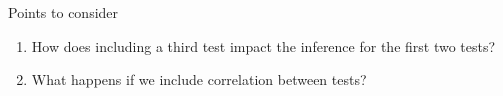 \documentclass[
  ignorenonframetext,
  aspectratio=169,
]{beamer}
\begin{document}
\begin{frame}[fragile]{Points to consider}
\protect\hypertarget{points-to-consider}{}
\begin{enumerate}
\item
  How does including a third test impact the inference for the first two
  tests?
\item
  What happens if we include correlation between tests?
\end{enumerate}

\begin{comment}

## Exercise 1 {.fragile}

Use the template_huiwalter function to look at the simple 2-test 5-population example from session 3.  Use this data simulation code:

\scriptsize

```r
# Set a random seed so that the data are reproducible:
set.seed(2022-09-13)

sensitivity <- c(0.9, 0.6)
specificity <- c(0.95, 0.9)
N <- 1000

# Change the number of populations here:
Populations <- 5
# Change the variation in prevalence here:
(prevalence <- runif(Populations, min=0.1, max=0.9))

data <- tibble(Population = sample(seq_len(Populations), N, replace=TRUE)) %
  mutate(Status = rbinom(N, 1, prevalence[Population])) %
  mutate(Test1 = rbinom(N, 1, sensitivity[1]*Status + (1-specificity[1])*(1-Status))) %
  mutate(Test2 = rbinom(N, 1, sensitivity[2]*Status + (1-specificity[2])*(1-Status))) %
  select(-Status)

(twoXtwoXpop <- with(data, table(Test1, Test2, Population)))
(Tally <- matrix(twoXtwoXpop, ncol=Populations))
(TotalTests <- apply(Tally, 2, sum))

template_huiwalter(data, outfile="template_2test.txt")
```

\normalsize

Look at the model code and familiarise yourself with how the model is set out (there are some small differences, but the overall code is equivalent).  Make sure you can modify the priors and add a deviance monitor.  Run the model.

Now activate the correlation terms between tests 1 and 2.  Is anything different about the results?

### Solution 1 {.fragile}

There is no particular solution to the first part of this exercise, but please ask if you have any questions about the model code that template_huiwalter generates.  Remember that re-running the template_huiwalter function will over-write your existing model including any changes you made, so be careful!


\end{comment}
\end{frame}
\end{document}
